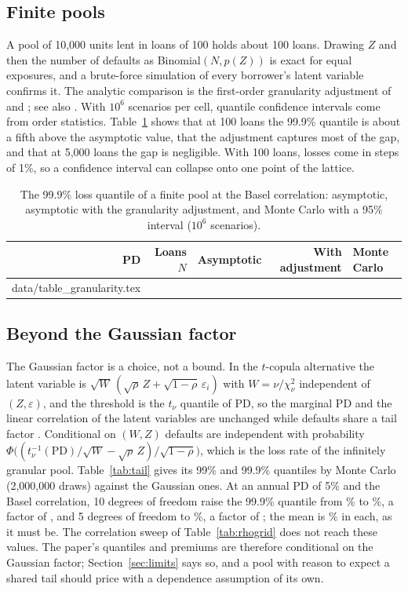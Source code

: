 \documentclass[11pt]{article}
\makeatletter
\theoremstyle{plain}
\theoremstyle{definition}
\newcommand{\inputrows}[1]{\@@input #1 }
\makeatother
\begin{document}
\subsection{Finite pools}

A pool of 10,000 units lent in loans of 100 holds about 100 loans. Drawing $Z$ and then the number of
defaults as Binomial$(N,p(Z))$ is exact for equal exposures, and a brute-force simulation of every
borrower's latent variable confirms it. The analytic comparison is the first-order granularity
adjustment of \citet{martin2002} and \citet{gordy2004}; see also \citet{gordy2013}. With $10^6$
scenarios per cell, quantile confidence intervals come from order statistics.
Table~\ref{tab:granularity} shows that at 100 loans the 99.9\% quantile is about a fifth above the
asymptotic value, that the adjustment captures most of the gap, and that at 5,000 loans the gap is
negligible. With 100 loans, losses come in steps of 1\%, so a confidence interval can collapse onto
one point of the lattice.

\begin{table}[ht]
  \centering\small
  \caption{The 99.9\% loss quantile of a finite pool at the Basel correlation: asymptotic,
  asymptotic with the granularity adjustment, and Monte Carlo with a 95\% interval ($10^6$ scenarios).}
  \label{tab:granularity}
  \begin{tabular}{rrrrl}
    \toprule
    PD & Loans $N$ & Asymptotic & With adjustment & Monte Carlo \\
    \midrule
    \inputrows{data/table_granularity.tex}
    \bottomrule
  \end{tabular}
\end{table}

\subsection{Beyond the Gaussian factor}\label{sec:tail}

The Gaussian factor is a choice, not a bound. In the $t$-copula alternative the latent variable is
$\sqrt{W}\,(\sqrt{\rho}\,Z+\sqrt{1-\rho}\,\varepsilon_i)$ with $W=\nu/\chi^2_\nu$ independent of
$(Z,\varepsilon)$, and the threshold is the $t_\nu$ quantile of PD, so the marginal PD and the linear
correlation of the latent variables are unchanged while defaults share a tail factor
\citep{frey2003,mcneil2015}. Conditional on $(W,Z)$ defaults are independent with probability
$\Phi\bigl((t_\nu^{-1}(\mathrm{PD})/\sqrt W-\sqrt\rho\,Z)/\sqrt{1-\rho}\bigr)$, which is the loss rate
of the infinitely granular pool. Table~\ref{tab:tail} gives its 99\% and 99.9\% quantiles by Monte Carlo
(2,000,000 draws) against the Gaussian ones. At an annual PD of 5\% and the Basel correlation, 10
degrees of freedom raise the 99.9\% quantile from \GaussQ\% to \TailTTenQ\%, a factor of
\TailTTenRatio, and 5 degrees of freedom to \TailTFiveQ\%, a factor of \TailTFiveRatio; the mean is
\TailTFiveMean\% in each, as it must be. The correlation sweep of Table~\ref{tab:rhogrid} does not reach
these values. The paper's quantiles and premiums are therefore conditional on the Gaussian factor;
Section~\ref{sec:limits} says so, and a pool with reason to expect a shared tail should price with a
dependence assumption of its own.
\end{document}
